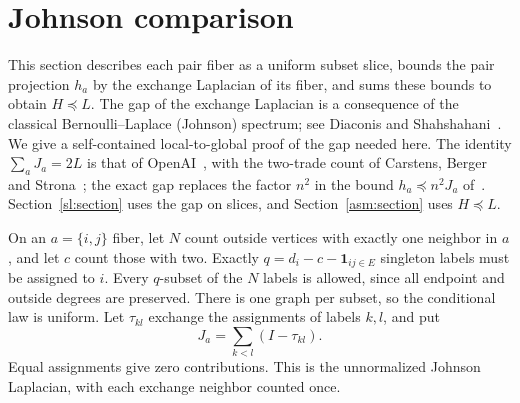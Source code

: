 \section{Johnson comparison}\label{joh:section}
This section describes each pair fiber as a uniform subset slice, bounds the
pair projection $h_a$ by the exchange Laplacian of its fiber, and sums these
bounds to obtain $H\preceq L$. The gap of the exchange Laplacian is a
consequence of the classical Bernoulli--Laplace (Johnson) spectrum; see
Diaconis and Shahshahani~\cite{DS87}. We give a self-contained
local-to-global proof of the gap needed here. The identity
$\sum_aJ_a=2L$ is that of OpenAI~\cite[Lemma~7.4]{OAI26}, with the two-trade
count of Carstens, Berger and Strona~\cite[Lemma~2]{CBS18}; the exact gap
replaces the factor $n^2$ in the bound $h_a\preceq n^2J_a$
of~\cite[Lemma~7.4]{OAI26}. Section~\ref{sl:section} uses the gap on
slices, and Section~\ref{asm:section} uses $H\preceq L$.

On an $a=\{i,j\}$ fiber, let $N$ count outside vertices with exactly one
neighbor in $a$, and let $c$ count those with two. Exactly
$q=d_i-c-\mathbf 1_{ij\in E}$ singleton labels must be assigned to $i$.
Every $q$-subset of the $N$ labels is allowed, since all endpoint and outside
degrees are preserved. There is one graph per subset, so the conditional law
is uniform. Let $\tau_{kl}$ exchange the assignments of labels $k,l$, and put
\[
 J_a=\sum_{k<l}(I-\tau_{kl}).
\]
Equal assignments give zero contributions. This is the unnormalized Johnson
Laplacian, with each exchange neighbor counted once.

